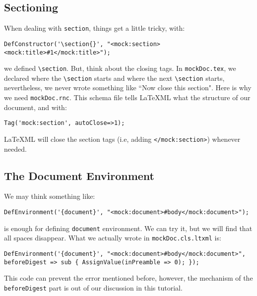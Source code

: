 \documentclass[a4paper]{article}
\def\latexml{{\LaTeX}ML\xspace}
\begin{document}
\subsection{Sectioning}
 When dealing with \lstinline|section|, things get a little tricky, with:
\begin{lstlisting}
DefConstructor('\section{}', "<mock:section><mock:title>#1</mock:title>");
\end{lstlisting}
we defined \lstinline|\section|. But, think about the closing tags. In \lstinline|mockDoc.tex|, we declared where the \lstinline|\section| starts and where the next \lstinline|\section| starts, nevertheless, we never wrote something like ``Now close this section". Here is why we need \lstinline|mockDoc.rnc|. This schema file tells \latexml what the structure of our document, and with:
\begin{lstlisting}
Tag('mock:section', autoClose=>1);
\end{lstlisting}
\latexml will close the section tags (i.e, adding \lstinline|</mock:section>|) whenever needed.

\subsection{The Document Environment}
We may think something like:
\begin{lstlisting}
DefEnvironment('{document}', "<mock:document>#body</mock:document>");
\end{lstlisting}
is enough for defining \lstinline|document| environment. We can try it, but we will find that all spaces disappear. What we actually wrote in \lstinline|mockDoc.cls.ltxml| is:
\begin{lstlisting}
DefEnvironment('{document}', "<mock:document>#body</mock:document>", beforeDigest => sub { AssignValue(inPreamble => 0); });
\end{lstlisting}
This code can prevent the error mentioned before, however, the mechanism of the \lstinline|beforeDigest| part is out of our discussion in this tutorial.
\end{document}
